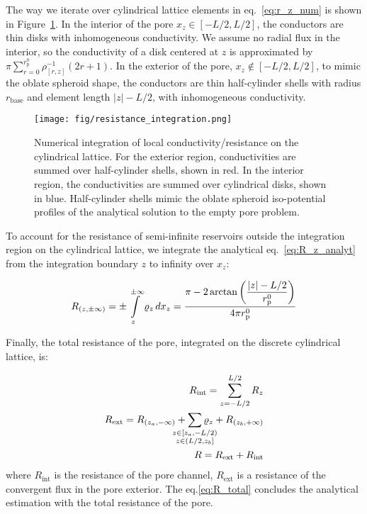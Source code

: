 \documentclass[10pt, a4paper]{article}
\begin{document}
\begin{multicols}{2}
The way we iterate over cylindrical lattice elements in eq.~\ref{eq:r_z_num} is shown in Figure~\ref{fig:integration_scheme}.
In the interior of the pore $x_z \in [-L/2, L/2]$, the conductors are thin disks with inhomogeneous conductivity.
We assume no radial flux in the interior, so the conductivity of a disk centered at $z$ is approximated by $\pi \sum_{r=0}^{r_{\text{p}}^{0}} \rho^{-1}_{[r,z]} (2r + 1)$.
In the exterior of the pore, $x_z \notin [-L/2, L/2]$, to mimic the oblate spheroid shape, the conductors are thin half-cylinder shells with radius $r_{\text{base}}$ and element length $|z| - L/2$, with inhomogeneous conductivity.
\begin{figure}[H]
    \centering
    \texttt{[image: fig/resistance\_integration.png]}
    \caption{
        Numerical integration of local conductivity/resistance on the cylindrical lattice.
        For the exterior region, conductivities are summed over half-cylinder shells, shown in red.
        In the interior region, the conductivities are summed over cylindrical disks, shown in blue.
        Half-cylinder shells mimic the oblate spheroid iso-potential profiles of the analytical solution to the empty pore problem.
        }
    \label{fig:integration_scheme}
\end{figure}

To account for the resistance of semi-infinite reservoirs outside the integration region on the cylindrical lattice, we integrate the analytical eq.~\ref{eq:R_z_analyt} from the integration boundary $z$ to infinity over $x_z$:

\begin{eqnarray}
    \label{eq:r_reservoir}
    R_{(z, \pm\infty)} = \pm \int\displaylimits_{z}^{\pm\infty} \varrho_{z} \, dx_z = \dfrac{\pi - 2 \arctan\left( \dfrac{|z| - L/2}{r_{\text{p}}^{0}} \right)}{4 \pi r_{\text{p}}^{0}}
\end{eqnarray}

Finally, the total resistance of the pore, integrated on the discrete cylindrical lattice, is:

\begin{eqnarray}
    R_{\text{int}} = \sum_{z=-L/2}^{L/2} R_z
    \\
    R_{\text{ext}} = R_{(z_{a}, -\infty)} + \sum\limits_{\mathclap{\substack{z \in [z_{a},-L/2)\\z \in (L/2, z_b]}}} \varrho_{z} + R_{(z_{b}, +\infty)}
    \\
    \label{eq:R_total}
    R = R_{\text{ext}} + R_{\text{int}}
\end{eqnarray}
where $R_{\text{int}}$ is the resistance of the pore channel, $R_{\text{ext}}$ is a resistance of the convergent flux in the pore exterior.
The eq.\ref{eq:R_total} concludes the analytical estimation with the total resistance of the pore.


\end{multicols}
\end{document}
